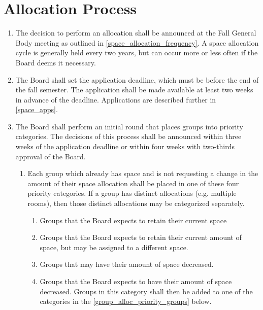 \documentclass[12pt]{article}
\begin{document}
\section{Allocation Process}
\label{space_apps_process}

\begin{enumerate}
    \item The decision to perform an allocation shall be announced at the Fall General Body meeting
        as outlined in \ref{space_allocation_frequency}.
    A space allocation cycle is generally held every two years, but can occur more or less often if
        the Board deems it necessary.
    
    \item The Board shall set the application deadline, which must be before the end of the fall semester.
    The application shall be made available at least two weeks in advance of the deadline.
    Applications are described further in \ref{space_apps}.

    \item The Board shall perform an initial round that places groups into priority categories.
    The decisions of this process shall be announced within three weeks of the application deadline or
        within four weeks with two-thirds approval of the Board.
    \begin{enumerate}
        \item Each group which already has space and is not requesting a change in the amount
            of their space allocation shall be placed in one of these four priority categories.
        If a group has distinct allocations (e.g. multiple rooms), then those distinct allocations
            may be categorized separately.
        \begin{enumerate}
            \item Groups that the Board expects to retain their current space
            \item Groups that the Board expects to retain their current amount of space, but
                may be assigned to a different space.
            \item Groups that may have their amount of space decreased.
            \item Groups that the Board expects to have their amount of space decreased.
            Groups in this category shall then be added to one of the categories in the
                \ref{group_alloc_priority_groups} below.
        \end{enumerate}


\end{enumerate}
\end{enumerate}
\end{document}
